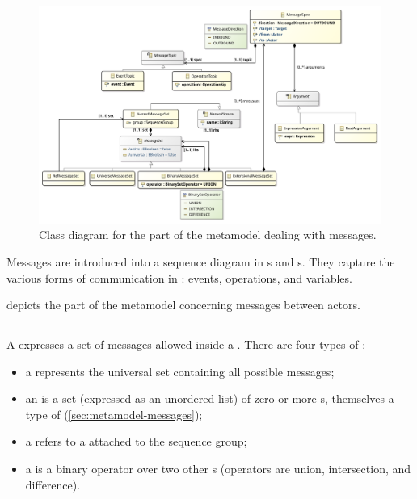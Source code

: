 \begin{figure}[htb]
	\centering
	\includegraphics[width=\textwidth]{diagrams/Messages}
	\caption{Class diagram for the part of the \langname{} metamodel dealing with messages.}
	\label{fig:metamodel-messages}
\end{figure}

\noindent
Messages are introduced into a sequence diagram
in \mmessageset s and \marrowaction s.  They capture the various forms of
communication in \robochart: events, operations, and 
variables.

 depicts the part of the metamodel concerning
messages between actors.

\subsection{\mmessageset}\label{ssec:metamodel-messages-sets}

A \mmessageset{} expresses a set of messages allowed 
inside a \msequencegap.  There are four types of \mmessageset:

\begin{itemize}
\item
  a \muniversemessageset{} represents the universal set containing 
  all possible messages;
\item	
  an \mextensionalmessageset{} is a set (expressed as an unordered list) of
  zero or more \mgapmessagespec s, themselves
  a type of \mmessagespec{} (\cref{sec:metamodel-messages});
\item
  a \mrefmessageset{} refers to a \mnamedmessageset{} attached to the
  sequence group;
\item
  a \mbinarymessageset{} is a binary operator over two other \mmessageset s
  (operators are union, intersection, and difference).
\end{itemize}

